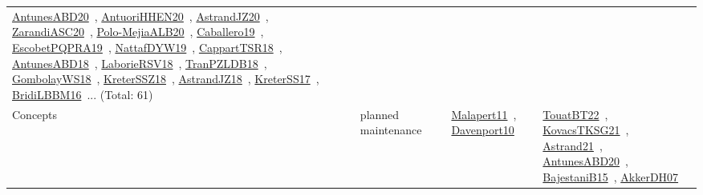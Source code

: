 {\begin{longtable}{lp{3cm}>{\raggedright\arraybackslash}p{6cm}>{\raggedright\arraybackslash}p{6cm}>{\raggedright\arraybackslash}p{8cm}}
\href{../works/AntunesABD20.pdf}{AntunesABD20}~\cite{AntunesABD20}, \href{../works/AntuoriHHEN20.pdf}{AntuoriHHEN20}~\cite{AntuoriHHEN20}, \href{../works/AstrandJZ20.pdf}{AstrandJZ20}~\cite{AstrandJZ20}, \href{../works/ZarandiASC20.pdf}{ZarandiASC20}~\cite{ZarandiASC20}, \href{../works/Polo-MejiaALB20.pdf}{Polo-MejiaALB20}~\cite{Polo-MejiaALB20}, \href{../works/Caballero19.pdf}{Caballero19}~\cite{Caballero19}, \href{../works/EscobetPQPRA19.pdf}{EscobetPQPRA19}~\cite{EscobetPQPRA19}, \href{../works/NattafDYW19.pdf}{NattafDYW19}~\cite{NattafDYW19}, \href{../works/CappartTSR18.pdf}{CappartTSR18}~\cite{CappartTSR18}, \href{../works/AntunesABD18.pdf}{AntunesABD18}~\cite{AntunesABD18}, \href{../works/LaborieRSV18.pdf}{LaborieRSV18}~\cite{LaborieRSV18}, \href{../works/TranPZLDB18.pdf}{TranPZLDB18}~\cite{TranPZLDB18}, \href{../works/GombolayWS18.pdf}{GombolayWS18}~\cite{GombolayWS18}, \href{../works/KreterSSZ18.pdf}{KreterSSZ18}~\cite{KreterSSZ18}, \href{../works/AstrandJZ18.pdf}{AstrandJZ18}~\cite{AstrandJZ18}, \href{../works/KreterSS17.pdf}{KreterSS17}~\cite{KreterSS17}, \href{../works/BridiLBBM16.pdf}{BridiLBBM16}~\cite{BridiLBBM16}... (Total: 61)\\
Concepts & planned maintenance &  & \href{../works/Malapert11.pdf}{Malapert11}~\cite{Malapert11}, \href{../works/Davenport10.pdf}{Davenport10}~\cite{Davenport10} & \href{../works/TouatBT22.pdf}{TouatBT22}~\cite{TouatBT22}, \href{../works/KovacsTKSG21.pdf}{KovacsTKSG21}~\cite{KovacsTKSG21}, \href{../works/Astrand21.pdf}{Astrand21}~\cite{Astrand21}, \href{../works/AntunesABD20.pdf}{AntunesABD20}~\cite{AntunesABD20}, \href{../works/BajestaniB15.pdf}{BajestaniB15}~\cite{BajestaniB15}, \href{../works/AkkerDH07.pdf}{AkkerDH07}~\cite{AkkerDH07}\\

\end{longtable}}
